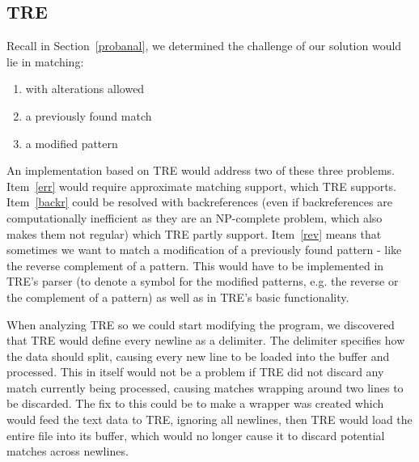 \subsection{TRE}\label{tre}
Recall in Section~\ref{probanal}, we determined the challenge of our 
solution would lie in matching:
\begin{enumerate}
\item \label{err} with alterations allowed
\item \label{backr} a previously found match 
\item \label{rev} a modified pattern
\end{enumerate}
An implementation based on TRE would address two of these three 
problems. Item~\ref{err} would require approximate matching support, which 
TRE supports. Item~\ref{backr} could be resolved 
with backreferences (even if backreferences are computationally inefficient as 
they are an NP-complete problem, which also makes them not regular) 
which TRE partly support. Item~\ref{rev} means that sometimes we want to 
match a modification of a previously found pattern - like the reverse 
complement of a pattern. This would have to be implemented in TRE's parser 
(to denote a symbol for the modified patterns, e.g. the reverse or the 
complement of a pattern) as 
well as in TRE's basic functionality.

When analyzing TRE so we could start modifying the 
program, we discovered that TRE would define every newline as a delimiter. The 
delimiter specifies how the data should split, causing every new line 
to be loaded into the buffer and processed. This in 
itself would not be a problem if TRE did not discard any match currently being 
processed, causing matches wrapping around two 
lines to be discarded. The fix to this could be to make a wrapper 
was created which would feed the text data to TRE, 
ignoring all newlines, then TRE would load the entire file into its buffer, 
which would no longer cause it to discard potential matches across newlines.

